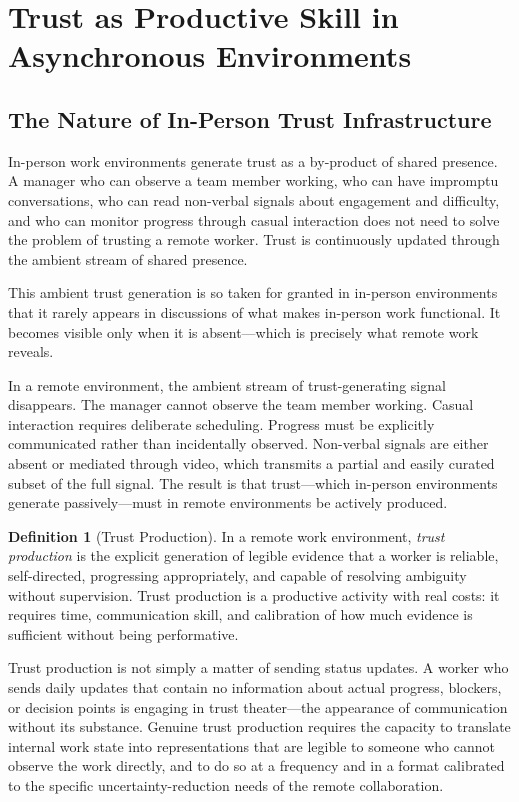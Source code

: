 \documentclass[12pt, a4paper]{article}
\theoremstyle{plain}
\theoremstyle{definition}
\newtheorem{definition}[proposition]{Definition}
\theoremstyle{remark}
\begin{document}
\section{Trust as Productive Skill in Asynchronous Environments}
\label{sec:trust}

\subsection{The Nature of In-Person Trust Infrastructure}

In-person work environments generate trust as a by-product of shared presence.
A manager who can observe a team member working, who can have impromptu conversations,
who can read non-verbal signals about engagement and difficulty,
and who can monitor progress through casual interaction
does not need to solve the problem of trusting a remote worker.
Trust is continuously updated through the ambient stream of shared presence.

This ambient trust generation is so taken for granted in in-person environments
that it rarely appears in discussions of what makes in-person work functional.
It becomes visible only when it is absent---which is precisely what remote work reveals.

In a remote environment, the ambient stream of trust-generating signal disappears.
The manager cannot observe the team member working.
Casual interaction requires deliberate scheduling.
Progress must be explicitly communicated rather than incidentally observed.
Non-verbal signals are either absent or mediated through video,
which transmits a partial and easily curated subset of the full signal.
The result is that trust---which in-person environments generate passively---must
in remote environments be actively produced.

\begin{definition}[Trust Production]
In a remote work environment, \emph{trust production} is the explicit generation
of legible evidence that a worker is reliable, self-directed, progressing appropriately,
and capable of resolving ambiguity without supervision.
Trust production is a productive activity with real costs:
it requires time, communication skill, and calibration of
how much evidence is sufficient without being performative.
\end{definition}

Trust production is not simply a matter of sending status updates.
A worker who sends daily updates that contain no information
about actual progress, blockers, or decision points is engaging in trust theater---the
appearance of communication without its substance.
Genuine trust production requires the capacity to translate internal work state
into representations that are legible to someone who cannot observe the work directly,
and to do so at a frequency and in a format calibrated to the specific
uncertainty-reduction needs of the remote collaboration.
\end{document}
